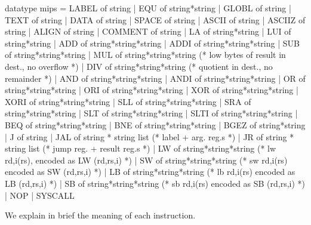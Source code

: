 \documentclass[11pt,a4paper]{article}
\begin{document}
\medskip
\begin{code}[frame=lines,label=\textit{MIPS.sml}]
datatype mips
 = LABEL of string
 | EQU of string*string
 | GLOBL of string
 | TEXT of string
 | DATA of string
 | SPACE of string
 | ASCII of string
 | ASCIIZ of string
 | ALIGN of string
 | COMMENT of string
 | LA of string*string
 | LUI of string*string
 | ADD of string*string*string
 | ADDI of string*string*string
 | SUB of string*string*string
 | MUL of string*string*string (* low bytes of result in dest., no overflow *)
 | DIV of string*string*string (* quotient in dest., no remainder *)
 | AND of string*string*string
 | ANDI of string*string*string
 | OR of string*string*string
 | ORI of string*string*string
 | XOR of string*string*string
 | XORI of string*string*string
 | SLL of string*string*string
 | SRA of string*string*string
 | SLT of string*string*string
 | SLTI of string*string*string
 | BEQ of string*string*string
 | BNE of string*string*string
 | BGEZ of string*string
 | J of string
 | JAL of string * string list (* label + arg. reg.s *)
 | JR of string * string list (* jump reg. + result reg.s *)
 | LW of string*string*string (* lw rd,i(rs), encoded as LW (rd,rs,i) *)
 | SW of string*string*string (* sw rd,i(rs) encoded as SW (rd,rs,i) *)
 | LB of string*string*string (* lb rd,i(rs) encoded as LB (rd,rs,i) *)
 | SB of string*string*string (* sb rd,i(rs) encoded as SB (rd,rs,i) *)
 | NOP
 | SYSCALL
\end{code}

We explain in brief the meaning of each instruction.
\end{document}
